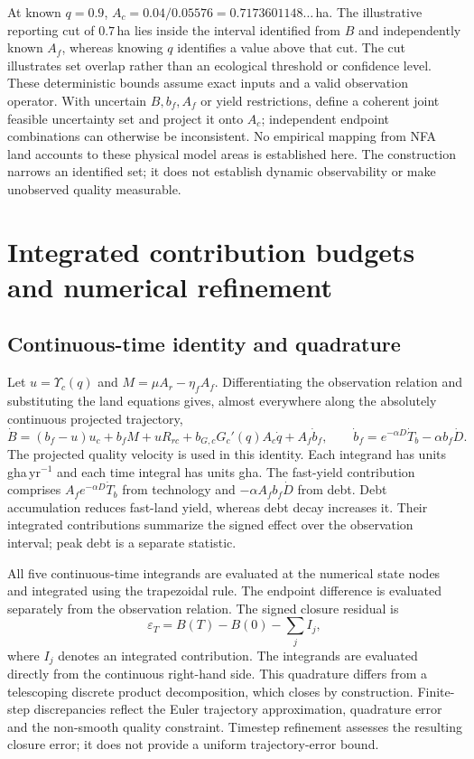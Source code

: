 \documentclass[11pt,a4paper]{article}
\newcommand{\Ups}{\Upsilon_c}
\begin{document}
At known $q=0.9$, $A_c=0.04/0.05576=0.7173601148\ldots$\,ha. The illustrative reporting cut of $0.7$\,ha lies inside the interval identified from $B$ and independently known $A_f$, whereas knowing $q$ identifies a value above that cut. The cut illustrates set overlap rather than an ecological threshold or confidence level. These deterministic bounds assume exact inputs and a valid observation operator. With uncertain $B,b_f,A_f$ or yield restrictions, define a coherent joint feasible uncertainty set and project it onto $A_c$; independent endpoint combinations can otherwise be inconsistent. No empirical mapping from NFA land accounts to these physical model areas is established here. The construction narrows an identified set; it does not establish dynamic observability or make unobserved quality measurable.

\section{Integrated contribution budgets and numerical refinement}\label{si:c13budget}

\subsection{Continuous-time identity and quadrature}

Let $u=\Ups(q)$ and $M=\mu A_r-\eta_fA_f$. Differentiating the observation relation and substituting the land equations gives, almost everywhere along the absolutely continuous projected trajectory,
\[
\dot B=(b_f-u)u_c+b_fM+uR_{rc}+b_{G,c}G_c'(q)A_c\dot q+A_f\dot b_f,
\qquad
\dot b_f=e^{-\alpha D}\dot T_b-\alpha b_f\dot D.
\]
The projected quality velocity is used in this identity. Each integrand has units gha\,yr$^{-1}$ and each time integral has units gha. The fast-yield contribution comprises $A_fe^{-\alpha D}\dot T_b$ from technology and $-\alpha A_fb_f\dot D$ from debt. Debt accumulation reduces fast-land yield, whereas debt decay increases it. Their integrated contributions summarize the signed effect over the observation interval; peak debt is a separate statistic.

All five continuous-time integrands are evaluated at the numerical state nodes and integrated using the trapezoidal rule. The endpoint difference is evaluated separately from the observation relation. The signed closure residual is
\[
\varepsilon_T=B(T)-B(0)-\sum_j I_j,
\]
where $I_j$ denotes an integrated contribution. The integrands are evaluated directly from the continuous right-hand side. This quadrature differs from a telescoping discrete product decomposition, which closes by construction. Finite-step discrepancies reflect the Euler trajectory approximation, quadrature error and the non-smooth quality constraint. Timestep refinement assesses the resulting closure error; it does not provide a uniform trajectory-error bound.
\end{document}
